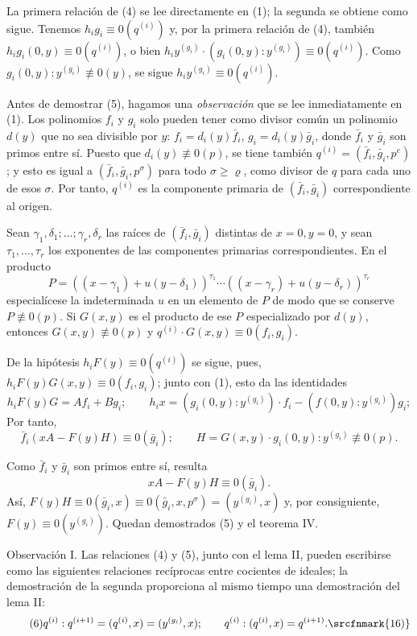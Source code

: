 La primera relación de (4) se lee directamente en (1); la segunda se obtiene como sigue. Tenemos $h_ig_i\equiv0(q^{(i)})$ y, por la primera relación de (4), también $h_ig_i(0,y)\equiv0(q^{(i)})$, o bien $h_iy^{(g_i)}\cdot(g_i(0,y):y^{(g_i)})\equiv0(q^{(i)})$. Como $g_i(0,y):y^{(g_i)}\not\equiv0(y)$, se sigue $h_iy^{(g_i)}\equiv0(q^{(i)})$.

Antes de demostrar (5), hagamos una \emph{observación} que se lee inmediatamente en (1). Los polinomios $f_i$ y $g_i$ solo pueden tener como divisor común un polinomio $d(y)$ que no sea divisible por $y$: $f_i=d_i(y)\bar f_i$, $g_i=d_i(y)\bar g_i$, donde $\bar f_i$ y $\bar g_i$ son primos entre sí. Puesto que $d_i(y)\not\equiv0(p)$, se tiene también $q^{(i)}=(\bar f_i,\bar g_i,p^e)$; y esto es igual a $(\bar f_i,\bar g_i,p^\sigma)$ para todo $\sigma\geq\varrho$, como divisor de $q$ para cada uno de esos $\sigma$. Por tanto, $q^{(i)}$ es la componente primaria de $(\bar f_i,\bar g_i)$ correspondiente al origen.

Sean $\gamma_1,\delta_1;\ldots;\gamma_r,\delta_r$ las raíces de $(\bar f_i,\bar g_i)$ distintas de $x=0,y=0$, y sean $\tau_1,\ldots,\tau_r$ los exponentes de las componentes primarias correspondientes. En el producto
\[
P=((x-\gamma_1)+u(y-\delta_1))^{\tau_1}\cdots
((x-\gamma_r)+u(y-\delta_r))^{\tau_r}
\]
especialícese la indeterminada $u$ en un elemento de $P$ de modo que se conserve $P\not\equiv0(p)$. Si $G(x,y)$ es el producto de ese $P$ especializado por $d(y)$, entonces $G(x,y)\not\equiv0(p)$ y $q^{(i)}\cdot G(x,y)\equiv0(f_i,g_i)$.

De la hipótesis $h_iF(y)\equiv0(q^{(i)})$ se sigue, pues, $h_iF(y)G(x,y)\equiv0(f_i,g_i)$; junto con (1), esto da las identidades
\[
h_iF(y)G=A f_i+B g_i;\qquad
h_ix=(g_i(0,y):y^{(g_i)})\cdot f_i-(f(0,y):y^{(g_i)})g_i;
\]
Por tanto,
\[
\bar f_i(xA-F(y)H)\equiv0(\bar g_i);\qquad
H=G(x,y)\cdot g_i(0,y):y^{(g_i)}\not\equiv0(p).
\]

Como $\bar f_i$ y $\bar g_i$ son primos entre sí, resulta
\[
xA-F(y)H\equiv0(\bar g_i).
\]
Así, $F(y)H\equiv0(\bar g_i,x)\equiv0(\bar g_i,x,p^\sigma)=(y^{(g_i)},x)$ y, por consiguiente, $F(y)\equiv0(y^{(g_i)})$. Quedan demostrados (5) y el teorema IV.

Observación I. Las relaciones (4) y (5), junto con el lema II, pueden escribirse como las siguientes relaciones recíprocas entre cocientes de ideales; la demostración de la segunda proporciona al mismo tiempo una demostración del lema II:
\begin{equation}
\tag{6}
q^{(i)}:q^{(i+1)}=(q^{(i)},x)=(y^{(g_i)},x);\qquad
q^{(i)}:(q^{(i)},x)=q^{(i+1)}.\srcfnmark{16)}
\end{equation}

